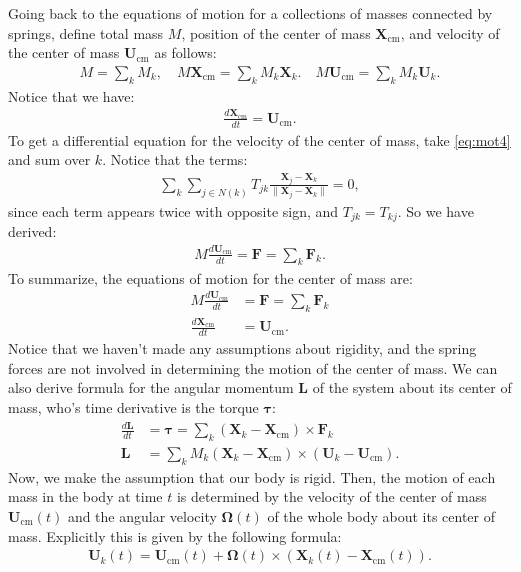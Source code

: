 \documentclass[10pt]{article}
\newcommand{\bs}[1]{{\boldsymbol #1}}
\begin{document}
Going back to the equations of motion for a collections of masses connected by springs, define total mass $M$, position of the center of mass ${\bs X}_\text{cm}$, and velocity of the center of mass ${\bs U}_\text{cm}$ as follows:
\begin{align*}
M = \sum_k M_k, \quad M {\bs X}_\text{cm} = \sum_k M_k {\bs X}_k. \quad M {\bs U}_\text{cm} = \sum_k M_k {\bs U}_k.
\end{align*}
Notice that we have:
\begin{align*}
\frac{d {\bs X}_\text{cm}}{dt} = {\bs U}_\text{cm}.
\end{align*}
To get a differential equation for the velocity of the center of mass, take \eqref{eq:mot4} and sum over $k$.  Notice that the terms:
\begin{align*}
\sum_k \sum_{j \in N(k)} T_{jk} \frac{{\bs X}_j - {\bs X}_k}{\| {\bs X}_j - {\bs X}_k \|} = 0,
\end{align*}
since each term appears twice with opposite sign, and $T_{jk} = T_{kj}$.  So we have derived:
\begin{align*}
M\frac{d {\bs U}_\text{cm}}{dt} = {\bs F} = \sum_k {\bs F}_k.
\end{align*}
To summarize, the equations of motion for the center of mass are:
\begin{align}
\label{eq:rigmot1}
M\frac{d {\bs U}_\text{cm}}{dt} &= {\bs F} = \sum_k {\bs F}_k \\
\label{eq:rigmot2}
\frac{d {\bs X}_\text{cm}}{dt} &= {\bs U}_\text{cm}.
\end{align}
Notice that we haven't made any assumptions about rigidity, and the spring forces are not involved in determining the motion of the center of mass.  We can also derive formula for the angular momentum ${\bs L}$ of the system about its center of mass, who's time derivative is the torque ${\bs \tau}$:
\begin{align*}
\frac{d {\bs L}}{dt} &= {\bs \tau} = \sum_k ({\bs X}_k - {\bs X}_\text{cm}) \times {\bs F}_k \\
{\bs L} &= \sum_k M_k ({\bs X}_k - {\bs X}_\text{cm}) \times ({\bs U}_k - {\bs U}_\text{cm}).
\end{align*}
Now, we make the assumption that our body is rigid.  Then, the motion of each mass in the body at time $t$ is determined by the velocity of the center of mass ${\bs U}_\text{cm}(t)$ and the angular velocity ${\bs \Omega}(t)$ of the whole body about its center of mass.  Explicitly this is given by the following formula:
\begin{align}
\label{eq:rigmot3}
{\bs U}_k(t) = {\bs U}_\text{cm}(t) + {\bs \Omega}(t) \times ({\bs X}_k(t) - {\bs X}_\text{cm}(t)).
\end{align}  
\end{document}
